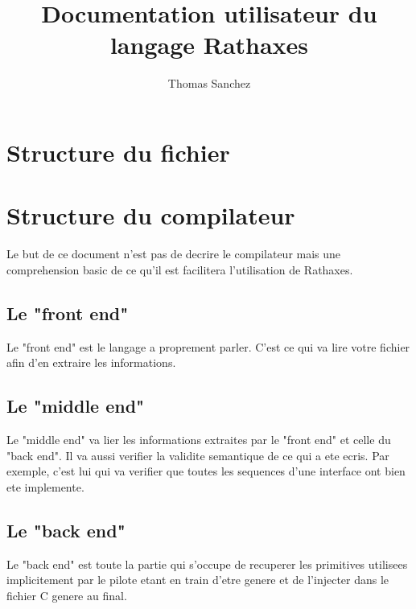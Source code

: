 \documentclass{rtxreport}
\author{Thomas Sanchez}
\title{Documentation utilisateur du langage Rathaxes}
\begin{document}
\maketitle

\rtxmaketitleblock

\tableofcontents


\lstset{language=rathaxes}

\chapter{Structure du fichier}


\chapter{Structure du compilateur}


Le but de ce document n'est pas de decrire le compilateur mais une comprehension basic de ce qu'il est
facilitera l'utilisation de Rathaxes.

\section{Le "front end"}

Le "front end" est le langage a proprement parler. C'est ce qui va lire votre fichier afin d'en extraire
les informations.

\section{Le "middle end"}

Le "middle end" va lier les informations extraites par le "front end" et celle du "back end". Il va aussi verifier
la validite semantique de ce qui a ete ecris. Par exemple, c'est lui qui va verifier que toutes les sequences
d'une interface ont bien ete implemente.

\section{Le "back end"}

Le "back end" est toute la partie qui s'occupe de recuperer les primitives utilisees implicitement par
le pilote etant en train d'etre genere et de l'injecter dans le fichier C genere au final.
\end{document}
